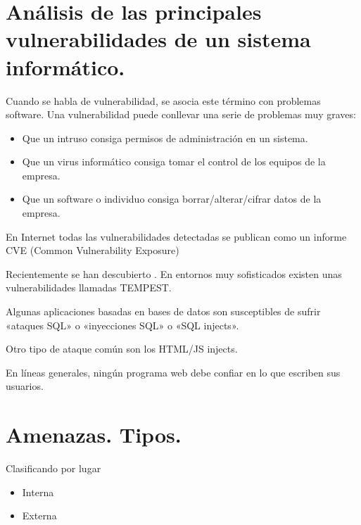 \documentclass[letterpaper,10pt,spanish]{sphinxmanual}
\begin{document}
\section{Análisis de las principales vulnerabilidades de un sistema informático.}
\label{\detokenize{tema_pautas_seguridad_informatica/tema_pautas_seguridad_informatica:analisis-de-las-principales-vulnerabilidades-de-un-sistema-informatico}}
Cuando se habla de vulnerabilidad, se asocia este término con problemas software. Una vulnerabilidad puede conllevar una serie de problemas muy graves:
\begin{itemize}
\item {} 
Que un intruso consiga permisos de administración en un sistema.

\item {} 
Que un virus informático consiga tomar el control de los equipos de la empresa.

\item {} 
Que un software o individuo consiga borrar/alterar/cifrar datos de la empresa.

\end{itemize}

En Internet todas las vulnerabilidades detectadas se publican como un informe CVE (Common Vulnerability Exposure)

Recientemente se han descubierto .
En entornos muy sofisticados existen unas vulnerabilidades llamadas TEMPEST.

Algunas aplicaciones basadas en bases de datos son susceptibles de sufrir «ataques SQL» o «inyecciones SQL» o «SQL injects».

Otro tipo de ataque común son los HTML/JS injects.

En líneas generales, ningún programa web debe confiar en lo que escriben sus usuarios.


\section{Amenazas. Tipos.}
\label{\detokenize{tema_pautas_seguridad_informatica/tema_pautas_seguridad_informatica:amenazas-tipos}}
Clasificando por lugar
\begin{itemize}
\item {} 
Interna

\item {} 
Externa

\end{itemize}
\end{document}
